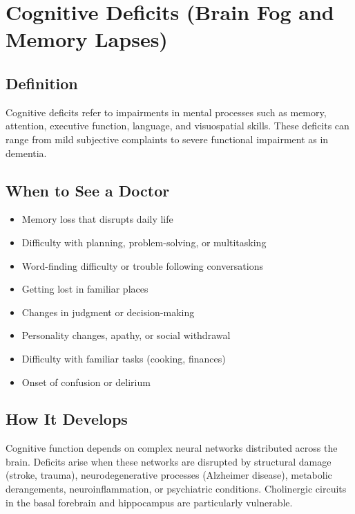 \chapter{Cognitive Deficits (Brain Fog and Memory Lapses)}

\section*{Definition}
Cognitive deficits refer to impairments in mental processes such as memory, attention, executive function, language, and visuospatial skills. These deficits can range from mild subjective complaints to severe functional impairment as in dementia.

\section*{When to See a Doctor}
\begin{itemize}
\item Memory loss that disrupts daily life
\item Difficulty with planning, problem-solving, or multitasking
\item Word-finding difficulty or trouble following conversations
\item Getting lost in familiar places
\item Changes in judgment or decision-making
\item Personality changes, apathy, or social withdrawal
\item Difficulty with familiar tasks (cooking, finances)
\item Onset of confusion or delirium
\end{itemize}

\section*{How It Develops}
Cognitive function depends on complex neural networks distributed across the brain. Deficits arise when these networks are disrupted by structural damage (stroke, trauma), neurodegenerative processes (Alzheimer disease), metabolic derangements, neuroinflammation, or psychiatric conditions. Cholinergic circuits in the basal forebrain and hippocampus are particularly vulnerable.

